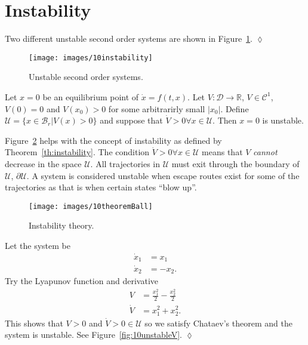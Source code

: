 \section{Instability}
\begin{example}
Two different unstable second order systems are shown in Figure~\ref{fig:10instability}.
$\lozenge$
\end{example}

\begin{figure}[ht!]
\centering
\texttt{[image: images/10instability]}
\caption{Unstable second order systems.}%
\label{fig:10instability}
\end{figure}

\begin{theorem}%
\label{th:instability}
Let $x=0$ be an equilibrium point of $\dot{x}=f(t,x)$.
Let $V:\mathcal{D}\to\mathbb{R}$, $V\in\mathcal{C}^1$, $V(0)=0$ and $V(x_0)>0$ for some arbitrarirly small $|x_0|$.
Define $\mathcal{U}=\{x\in \mathcal{B}_r | V(x)>0\}$ and suppose that $\dot{V}>0 \forall x\in\mathcal{U}$.
Then $x=0$ is unstable.
\end{theorem}

Figure~\ref{fig:10theoremBall} helps with the concept of instability as defined by Theorem~\ref{th:instability}.
The condition $\dot{V}>0\forall x\in\mathcal{U}$ means that $V$ \textit{cannot} decrease in the space $\mathcal{U}$.
All trajectories in $\mathcal{U}$ must exit through the boundary of $\mathcal{U}$, $\partial\mathcal{U}$.
A system is considered unstable when escape routes exist for some of the trajectories as that is when certain states ``blow up''.

\begin{figure}[ht!]
\centering
\texttt{[image: images/10theoremBall]}
\caption{Instability theory.}%
\label{fig:10theoremBall}
\end{figure}

\begin{example}
Let the system be
\begin{align*}
\dot{x}_1 &= x_1 \\
\dot{x}_2 &= -x_2.
\end{align*}
Try the Lyapunov function and derivative
\begin{align*}
V &= \frac{x_1^2}{2} - \frac{x_2^2}{2} \\
\dot{V} &= x_1^2 + x_2^2.
\end{align*}
This shows that $V>0$ and $\dot{V}>0\in\mathcal{U}$ so we satisfy Chataev's theorem and the system is unstable.
See Figure~\ref{fig:10unstableV}.
$\lozenge$
\end{example}

